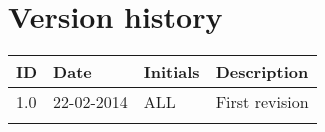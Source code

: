 \documentclass[Main]{subfiles}
\begin{document}
\section*{Version history}

\begin{tabular}{p{} p{} p{} p{}}
\hline
\textbf{ID} & \textbf{Date} & \textbf{Initials} & \textbf{Description}
\\
\hline
1.0 & 22-02-2014 & ALL & First revision
\\

\\\hline 
\end{tabular} 
\end{document}
